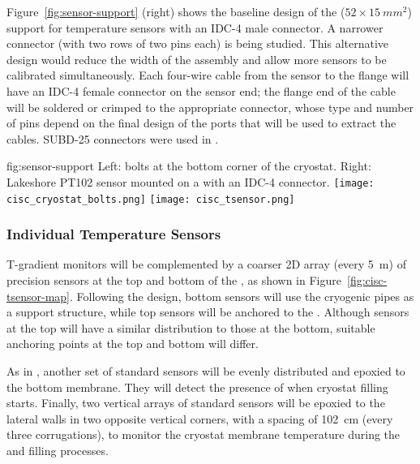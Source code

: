 Figure~\ref{fig:sensor-support} (right) shows the baseline design of the ($52\times \SI{15}{mm^2}$)  support for temperature sensors with an IDC-4 male connector. A narrower connector (with two rows of two pins each) is being studied. This alternative design would reduce the width of the  assembly and allow more sensors to be calibrated simultaneously. Each four-wire cable from the sensor to the flange will have an IDC-4 female connector on the sensor end; the flange end of the cable will be soldered or crimped to the appropriate connector, whose type and number of pins  depend on the final design of the  ports that will be used to extract the cables. SUBD-25 connectors were used in .

\begin{dunefigure}{fig:sensor-support}
  {Left: bolts at the bottom corner of the cryostat. Right: Lakeshore PT102 sensor mounted on a  with an IDC-4 connector.}
  \texttt{[image: cisc\_cryostat\_bolts.png]}%
    \hspace{1cm}%
  \texttt{[image: cisc\_tsensor.png]}%
\end{dunefigure}


\subsubsection{Individual Temperature Sensors}
\label{sec:fdgen-slow-cryo-individual-therm}

T-gradient monitors will be complemented by a coarser 2D array (every \SI{5}{m}) of precision sensors at the top and bottom of the , as shown in Figure~\ref{fig:cisc-tsensor-map}. Following the  design, bottom sensors will use the cryogenic pipes as a support structure, while top sensors will be anchored to the . Although sensors at the top will have a similar distribution to those at the bottom, %
suitable anchoring points at the top and bottom will differ. 

As in , another set of standard sensors will be evenly distributed and epoxied to the bottom membrane. They will detect the presence of  when cryostat filling starts. Finally, two vertical arrays of standard sensors will be epoxied to the lateral walls in two opposite vertical corners, with a spacing of \SI{102}{cm} (every three corrugations), to monitor the cryostat membrane temperature during the \cooldown and filling processes. 

